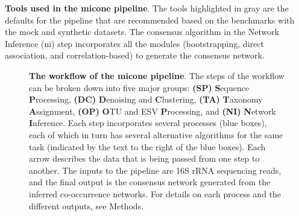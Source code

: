 \documentclass[letterpaper,12pt]{article}
\begin{document}

  \begin{table}[H]
    \centering
    \caption{
      \textbf{Tools used in the \ac{micone} pipeline}.
      The tools highlighted in gray are the defaults for the pipeline that are recommended based on the benchmarks with the mock and synthetic datasets.
      The consensus algorithm in the Network Inference (\ac{ni}) step incorporates all the modules (bootstrapping, direct association, and correlation-based) to generate the consensus network.
    }
    \label{tab:micone_tools}
  \end{table}


  \begin{figure}[H]
    \centering
    \caption{
      \textbf{The workflow of the \ac{micone} pipeline}.
      The steps of the workflow can be broken down into five major groups: \textbf{(SP)} \textbf{S}equence \textbf{P}rocessing, \textbf{(DC)} \textbf{D}enoising and \textbf{C}lustering, \textbf{(TA)} \textbf{T}axonomy \textbf{A}ssignment, \textbf{(OP)} \textbf{O}TU and ESV \textbf{P}rocessing, and \textbf{(NI)} \textbf{N}etwork \textbf{I}nference.
      Each step incorporates several processes (blue boxes), each of which in turn has several alternative algorithms for the same task (indicated by the text to the right of the blue boxes).
      Each arrow describes the data that is being passed from one step to another.
      The inputs to the pipeline are 16S rRNA sequencing reads, and the final output is the consensus network generated from the inferred co-occurrence networks.
      For details on each process and the different outputs, see Methods.
    }
    \label{fig:figure1}
  \end{figure}
\end{document}
